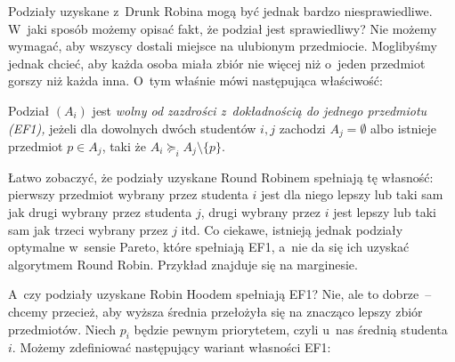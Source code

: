 Podziały uzyskane z~Drunk Robina mogą być jednak bardzo niesprawiedliwe. 
W~jaki sposób możemy opisać fakt, że podział jest sprawiedliwy? Nie możemy wymagać, aby wszyscy dostali miejsce na ulubionym przedmiocie. Moglibyśmy jednak chcieć, aby każda osoba miała zbiór nie więcej niż o~jeden przedmiot gorszy niż każda inna.
O~tym właśnie mówi następująca właściwość:

{ 
Podział $(A_i)$ jest \emph{\color{magenta} wolny od zazdrości z~dokładnością do jednego przedmiotu (EF1),} jeżeli dla dowolnych dwóch studentów $i,j$ zachodzi $A_j = \emptyset$ albo istnieje przedmiot $p \in A_j$, taki że $A_i \succeq_i A_j \setminus \{p\}$.\par}

Łatwo zobaczyć, że podziały uzyskane Round Robinem spełniają tę własność: 
pierwszy przedmiot wybrany przez studenta $i$ jest dla niego lepszy lub taki sam jak drugi wybrany przez studenta $j$, drugi wybrany przez $i$ jest lepszy lub taki sam jak trzeci wybrany przez $j$ itd.
Co ciekawe, istnieją jednak podziały optymalne w~sensie Pareto, które spełniają EF1, a~nie da się ich uzyskać algorytmem Round Robin. 
Przykład znajduje się na marginesie.

A~czy podziały uzyskane Robin Hoodem spełniają EF1? 
Nie, ale to dobrze~-- chcemy przecież, aby wyższa średnia przełożyła się na znacząco lepszy zbiór przedmiotów.
Niech $p_i$ będzie pewnym priorytetem, czyli u~nas średnią studenta~$i$.
Możemy zdefiniować następujący wariant własności EF1:

